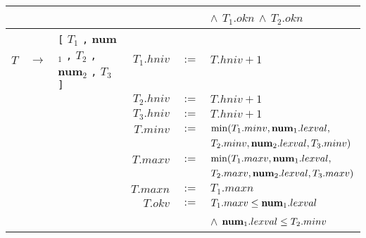\documentclass[class=article]{standalone}
\begin{document}
{\begin{tabular}{|rcl|rcl|}
          &               &                                                                                       &           &      & $\wedge$ $T_1.okn$ $\wedge$ $T_2.okn$\\
      \hline
    $T$ & $\rightarrow$ & \lstinline[]$[$ $T_1$ \lstinline[]$,$ {\bf num$_1$} \lstinline[]$,$  $T_2$ \lstinline[]$,$ {\bf num$_2$} \lstinline[]$,$ $T_3$ \lstinline[]$]$  & $T_1.hniv$ & $:=$ & $T.hniv + 1$ \\
        &               &                                                                                                                                                 & $T_2.hniv$ & $:=$ & $T.hniv + 1$\\
        &               &                                                                                                                                                 & $T_3.hniv$ & $:=$ & $T.hniv + 1$\\
        &               &                                                                                                                                                 & $T.minv$  & $:=$ & $\min(T_1.minv, {\bf num}_1.lexval,$\\
        &               &                                                                                                                                                 &           &      & $T_2.minv, {\bf num}_2.lexval, T_3.minv)$\\
        &               &                                                                                                                                                 & $T.maxv$  & $:=$ & $\min(T_1.maxv, {\bf num}_1.lexval,$\\
        &               &                                                                                                                                                 &           &      & $T_2.maxv, {\bf num}_2.lexval, T_3.maxv)$\\
        &               &                                                                                                                                                 & $T.maxn$  & $:=$ & $T_1.maxn$\\
        &               &                                                                                                                                                 & $T.okv$   & $:=$ & $T_1.maxv \leq {\bf num}_1.lexval$\\
        &               &                                                                                                                                                 &           &      & $\wedge$ ${\bf num}_1.lexval \leq T_2.minv$\\

\end{tabular}}
\end{document}
